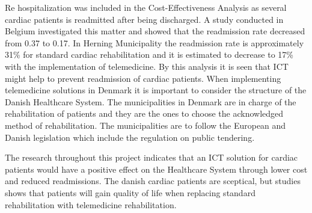 Re hospitalization was included in the Cost-Effectiveness Analysis as several cardiac patients is readmitted after being discharged. A study conducted in Belgium investigated this matter and showed that the readmission rate decreased from 0.37 to 0.17. In Herning Municipality the readmission rate is approximately 31\% for standard cardiac rehabilitation and it is estimated to decrease to 17\% with the implementation of telemedicine. By this analysis it is seen that ICT might help to prevent readmission of cardiac patients. 
\newpage
When implementing telemedicine solutions in Denmark it is important to consider the structure of the Danish Healthcare System. The municipalities in Denmark are in charge of the rehabilitation of patients and they are the ones to choose the acknowledged method of rehabilitation. The municipalities are to follow the European and Danish legislation which include the regulation on public tendering. 

The research throughout this project indicates that an ICT solution for cardiac patients would have a positive effect on the Healthcare System through lower cost and reduced readmissions. The danish cardiac patients are sceptical, but studies shows that patients will gain quality of life when replacing standard rehabilitation with telemedicine rehabilitation.  



